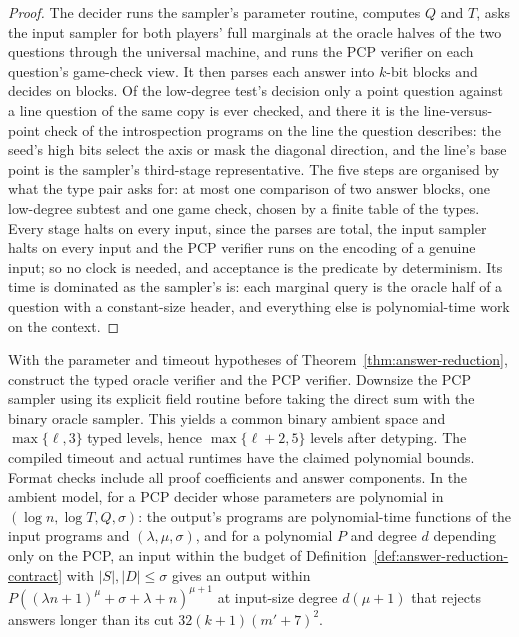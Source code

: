 \begin{proof}
\leanok
The decider runs the sampler's parameter routine, computes $Q$ and $T$, asks the input sampler
for both players' full marginals at the oracle halves of the two questions through the universal
machine, and runs the PCP verifier on each question's game-check view. It then parses each
answer into $k$-bit blocks and decides on blocks. Of the low-degree test's decision only a point
question against a line question of the same copy is ever checked, and there it is the
line-versus-point check of the introspection programs on the line the question describes: the
seed's high bits select the axis or mask the diagonal direction, and the line's base point is the
sampler's third-stage representative. The five steps are organised by what the type pair asks
for: at most one comparison of two answer blocks, one low-degree subtest and one game check,
chosen by a finite table of the types. Every stage halts on every input, since the parses are
total, the input sampler halts on every input and the PCP verifier runs on the encoding of a
genuine input; so no clock is needed, and acceptance is the predicate by determinism. Its time is
dominated as the sampler's is: each marginal query is the oracle half of a question with a
constant-size header, and everything else is polynomial-time work on the context.
\end{proof}

\begin{lemma}
\label{lem:ar-construction}
\leanok
With the parameter and timeout hypotheses of Theorem~\ref{thm:answer-reduction},
construct the typed oracle verifier and the PCP verifier. Downsize the PCP
sampler using its explicit field routine before taking the direct sum with
the binary oracle sampler. This yields a common binary ambient space and
$\max\{\ell,3\}$ typed levels, hence $\max\{\ell+2,5\}$ levels after detyping.
The compiled timeout and actual runtimes have the claimed polynomial bounds.
Format checks include all proof coefficients and answer components.
In the ambient model, for a PCP decider whose parameters are polynomial in
$(\log n,\log T,Q,\sigma)$: the output's programs are polynomial-time functions of the input
programs and $(\lambda,\mu,\sigma)$, and for a polynomial $P$ and degree $d$ depending only on the
PCP, an input within the budget of Definition~\ref{def:answer-reduction-contract} with
$|S|,|D|\le\sigma$ gives an output within $P((\lambda n+1)^\mu+\sigma+\lambda+n)^{\mu+1}$ at
input-size degree $d(\mu+1)$ that rejects answers longer than its cut $32(k+1)(m'+7)^2$.
\end{lemma}

